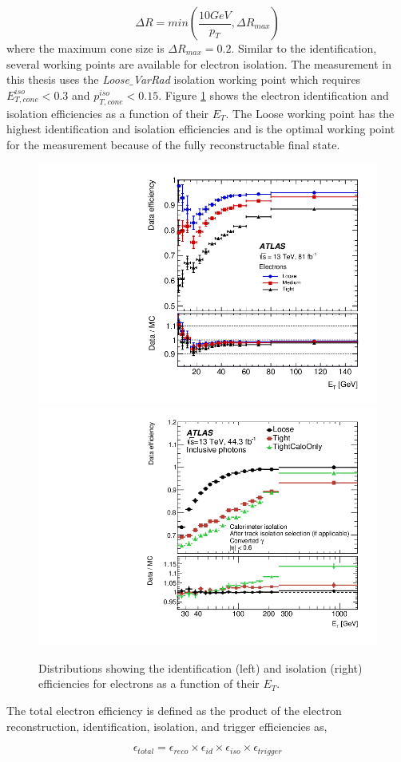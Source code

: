 \begin{equation}
\Delta R = min \left( \frac{10 GeV}{p_{T}},\Delta R_{max} \right)
\end{equation}
where the maximum cone size is $\Delta R_{max} = 0.2$. Similar to the identification, several working points are available for electron isolation. The measurement in this thesis uses the \textit{Loose$\_$VarRad} isolation working point which requires $E_{T,cone}^{iso} < 0.3$ and $p_{T,cone}^{iso} < 0.15$. Figure \ref{fig:ElecEff} shows the electron identification and isolation efficiencies as a function of their $E_{T}$. The Loose working point has the highest identification and isolation efficiencies and is the optimal working point for the measurement because of the fully reconstructable final state.

\begin{figure}
    \centering
    \includegraphics[width=.49\linewidth]{figures/LHC/ElecIdent_Eff.png}
    \includegraphics[width=.49\linewidth]{figures/LHC/Elec_IsoEff.png}
    \caption{ Distributions showing the identification (left) and isolation (right) efficiencies for electrons as a function of their $E_{T}$\cite{ElectronReco}.\label{fig:ElecEff}}
\end{figure}

The total electron efficiency is defined as the product of the electron reconstruction, identification, isolation, and trigger efficiencies as, 

\begin{equation}
    \epsilon_{total} = \epsilon_{reco} \times \epsilon_{id} \times \epsilon_{iso} \times \epsilon_{trigger}     
\end{equation}

